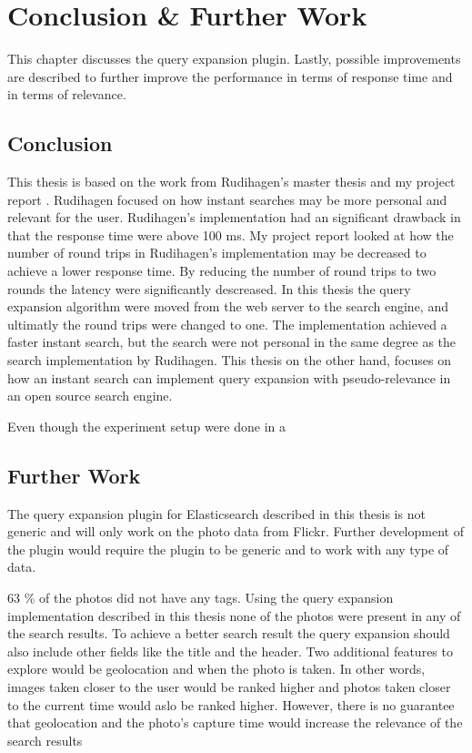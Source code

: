 \chapter{Conclusion \& Further Work}
\label{ch:conclusion}
This chapter discusses the query expansion plugin.
Lastly,
possible improvements are described to further improve the performance in terms of response time and in terms of relevance.

\section{Conclusion}
This thesis is based on the work from Rudihagen's master thesis \cite{master-thesis} and my project report \cite{project-report}.
Rudihagen focused on how instant searches may be more personal and relevant for the user.
Rudihagen's implementation had an significant drawback in that the response time were above 100 ms.
My project report looked at how the number of round trips in Rudihagen's implementation may be decreased to achieve a lower response time.
By reducing the number of round trips to two rounds the latency were significantly descreased.
In this thesis the query expansion algorithm were moved from the web server to the search engine,
and ultimatly the round trips were changed to one.
The implementation achieved a faster instant search,
but the search were not personal in the same degree as the search implementation by Rudihagen.
This thesis on the other hand,
focuses on how an instant search can implement query expansion with pseudo-relevance in an open source search engine.


Even though the experiment setup were done in a

\section{Further Work}
The query expansion plugin for Elasticsearch described in this thesis is not generic and will only work on the photo data from Flickr.
Further development of the plugin would require the plugin to be generic and to work with any type of data.

63 \% of the photos did not have any tags.
Using the query expansion implementation described in this thesis none of the photos were present in any of the search results.
To achieve a better search result the query expansion should also include other fields like the title and the header.
Two additional features to explore would be geolocation and when the photo is taken.
In other words,
images taken closer to the user would be ranked higher and photos taken closer to the current time would aslo be ranked higher.
However, there is no guarantee that geolocation and the photo's capture time would increase the relevance of the search results




